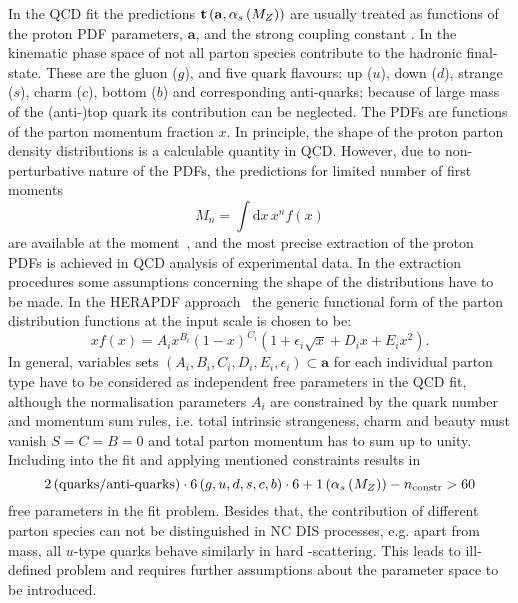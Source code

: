 In the QCD fit the predictions $\mathbf{t}\left( \mathbf{a},\mbox{$\alpha_{s}\left(M_{Z}\right)$}\right)$ are usually treated as functions of the proton PDF parameters, $\mathbf{a}$, and the strong coupling constant \asz. In the kinematic phase space of \hera not all parton species contribute to the hadronic final-state. These are the gluon ($g$), and five quark flavours: up ($u$), down ($d$), strange ($s$), charm ($c$), bottom ($b$) and corresponding anti-quarks; because of large mass of the (anti-)top quark its contribution can be neglected. The PDFs are functions of the parton momentum fraction $x$. In principle, the shape of the proton parton density distributions is a calculable quantity in QCD. However, due to non-perturbative nature of the PDFs, the predictions for limited number of first moments 
\begin{equation}
 M_n=\int\mathrm{d}x\,x^n f\left(x\right)
\end{equation}
are available at the moment~\cite{Hagler:2009ni}, and the most precise extraction of the proton PDFs is achieved in QCD analysis of experimental data. In the extraction procedures some assumptions concerning the shape of the distributions have to be made. In the HERAPDF approach~\cite{Aaron:2009aa} the generic functional form of the parton distribution functions at the input scale is chosen to be:
\begin{equation}
 xf\left(x\right) = A_ix^{B_i}\left(1-x\right)^{C_i}\left(1+\epsilon_i\sqrt{x}+D_ix+E_ix^2\right).
 \label{eq:pdfansatz}
\end{equation}
In general, variables sets $\left(A_i,B_i,C_i,D_i,E_i,\epsilon_i\right)\subset\mathbf{a}$ for each individual parton type have to be considered as independent free parameters in the QCD fit, although the normalisation parameters $A_i$ are constrained by the quark number and momentum sum rules, i.e. total intrinsic strangeness, charm and beauty must vanish $S=C=B=0$ and total parton momentum has to sum up to unity. Including \asz into the fit and applying mentioned constraints results in 
\begin{equation}
2 \left( \text{quarks/anti-quarks}\right)\cdot 6\left(g,u,d,s,c,b\right)\cdot 6 + 1\left(\mbox{$\alpha_{s}\left(M_{Z}\right)$}\right) - n_\text{constr} > 60
\end{equation}
free parameters in the fit problem. Besides that, the contribution of different parton species can not be distinguished in NC DIS processes, e.g. apart from mass, all $u$-type quarks behave similarly in hard \ep-scattering. 
This leads to ill-defined problem and requires further assumptions about the parameter space to be introduced. 

